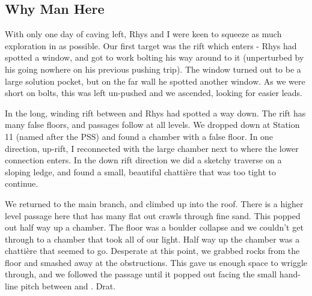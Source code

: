
 \subsection{Why Man Here}
 
 
 


With only one day of caving left, Rhys and I were keen to squeeze as much exploration in as possible. Our first target was the rift which  enters - Rhys had spotted a window, and got to work bolting his way around to it (unperturbed by his  going nowhere on his previous pushing trip). The window turned out to be a large solution pocket, but on the far wall he spotted another window. As we were short on bolts, this was left un-pushed and we ascended, looking for easier leads.


 
In the long, winding rift between  and  Rhys had spotted a way down. The rift has many false floors, and passages follow at all levels. We dropped down at Station 11 (named after the PSS) and found a chamber with a false floor. In one direction, up-rift, I reconnected with the large chamber next to  where the lower  connection enters. In the down rift direction we did a sketchy traverse on a sloping ledge, and found a small, beautiful chattière that was too tight to continue.
 
We returned to the main branch, and climbed up into the roof. There is a higher level passage here that has many flat out crawls through fine sand. This popped out half way up a chamber. The floor was a boulder collapse and we couldn't get through to a chamber that took all of our light. Half way up the chamber was a chattière that seemed to go. Desperate at this point, we grabbed rocks from the floor and smashed away at the obstructions. This gave us enough space to wriggle through, and we followed the passage until it popped out facing the small hand-line pitch between  and . Drat.
 
 
